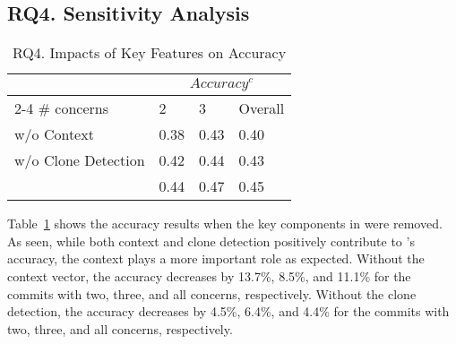 \subsection{RQ4. Sensitivity Analysis}


\begin{table}[t]
	\caption{RQ4. Impacts of Key Features on Accuracy}
	\vspace{-0.1in}
	\begin{center}
		\footnotesize
		\tabcolsep 4pt
		\renewcommand{\arraystretch}{1} \begin{tabular}{p{3cm}<{\centering}|p{0.8cm}<{\centering}p{0.8cm}<{\centering}p{0.8cm}<{\centering}}
			
			\hline
			       \multirow{2}{*}{}                  & \multicolumn{3}{c}{$Accuracy^c$}\\
			                         \cline{2-4}
			    \# concerns                     & 2 & 3& Overall\\
			\hline

			\tool w/o Context        &  0.38 & 0.43  &   0.40        \\
			\tool w/o Clone Detection     &  0.42 & 0.44  &   0.43        \\
       			\tool                    &  0.44 & 0.47  &   0.45        \\
			\hline
		\end{tabular}
		\label{RQ4-result-1}
	\end{center}
\end{table}

Table~\ref{RQ4-result-1} shows the accuracy results when the key
components in {\tool} were removed. As seen, while both context and
clone detection positively contribute to {\tool}'s accuracy, the
context plays a more important role as expected. Without the context
vector, the accuracy decreases by 13.7\%, 8.5\%, and 11.1\% for the
commits with two, three, and all concerns, respectively. Without the
clone detection, the accuracy decreases by 4.5\%, 6.4\%, and 4.4\% for
the commits with two, three, and all concerns, respectively.



